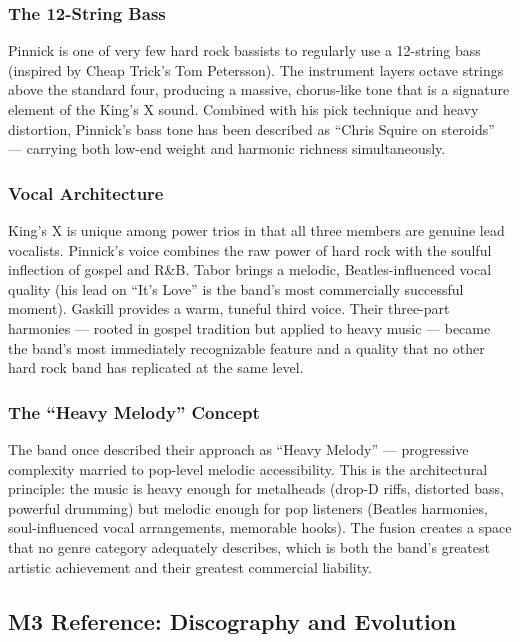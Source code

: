 \documentclass[11pt,letterpaper]{article}
\begin{document}
\subsubsection{The 12-String Bass}

Pinnick is one of very few hard rock bassists to regularly use a 12-string bass (inspired by Cheap Trick's Tom Petersson). The instrument layers octave strings above the standard four, producing a massive, chorus-like tone that is a signature element of the King's X sound. Combined with his pick technique and heavy distortion, Pinnick's bass tone has been described as ``Chris Squire on steroids'' --- carrying both low-end weight and harmonic richness simultaneously.

\subsubsection{Vocal Architecture}

King's X is unique among power trios in that all three members are genuine lead vocalists. Pinnick's voice combines the raw power of hard rock with the soulful inflection of gospel and R\&B. Tabor brings a melodic, Beatles-influenced vocal quality (his lead on ``It's Love'' is the band's most commercially successful moment). Gaskill provides a warm, tuneful third voice. Their three-part harmonies --- rooted in gospel tradition but applied to heavy music --- became the band's most immediately recognizable feature and a quality that no other hard rock band has replicated at the same level.

\subsubsection{The ``Heavy Melody'' Concept}

The band once described their approach as ``Heavy Melody'' --- progressive complexity married to pop-level melodic accessibility. This is the architectural principle: the music is heavy enough for metalheads (drop-D riffs, distorted bass, powerful drumming) but melodic enough for pop listeners (Beatles harmonies, soul-influenced vocal arrangements, memorable hooks). The fusion creates a space that no genre category adequately describes, which is both the band's greatest artistic achievement and their greatest commercial liability.

\subsection{M3 Reference: Discography and Evolution}
\end{document}
